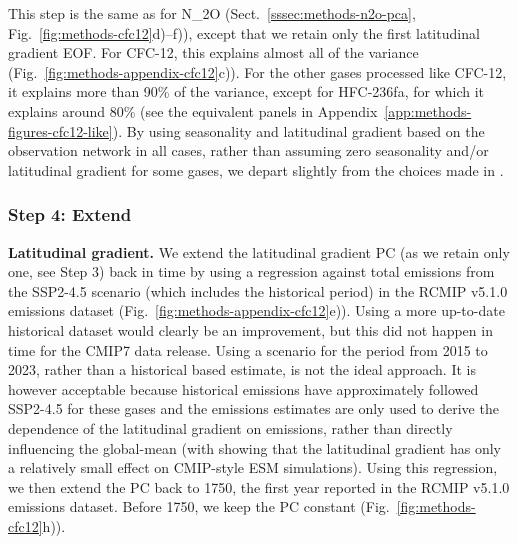 This step is the same as for N_2O (Sect.~\ref{sssec:methods-n2o-pca}, Fig.~\ref{fig:methods-cfc12}d)--f)),
except that we retain only the first latitudinal gradient EOF.
For CFC-12, this explains almost all of the variance (Fig.~\ref{fig:methods-appendix-cfc12}c)).
For the other gases processed like CFC-12, it explains more than 90\% of the variance,
except for HFC-236fa, for which it explains around 80\%
(see the equivalent panels in Appendix~\ref{app:methods-figures-cfc12-like}).
By using seasonality and latitudinal gradient based on the observation network in all cases,
rather than assuming zero seasonality and/or latitudinal gradient for some gases,
we depart slightly from the choices made in \citet{meinshausen_historical-ghgs_2017}.

\subsubsection{Step 4: Extend}
\label{sssec:methods-cfc12-like-extend}

\textbf{Latitudinal gradient.}
We extend the latitudinal gradient PC (as we retain only one, see Step 3)
back in time by using a regression against total emissions
from the SSP2-4.5 scenario (which includes the historical period) in the RCMIP v5.1.0 emissions dataset \citep{nicholls_rcmip_2020} (Fig.~\ref{fig:methods-appendix-cfc12}e)).
Using a more up-to-date historical dataset would clearly be an improvement,
but this did not happen in time for the CMIP7 data release.
Using a scenario for the period from 2015 to 2023, rather than a historical based estimate, is not the ideal approach.
It is however acceptable because historical emissions have approximately followed SSP2-4.5 for these gases
and the emissions estimates are only used to derive the dependence of the latitudinal gradient on emissions,
rather than directly influencing the global-mean
(with \citealp{meinshausen_historical-ghgs_2017} showing that the latitudinal gradient
has only a relatively small effect on CMIP-style ESM simulations).
Using this regression, we then extend the PC back to 1750,
the first year reported in the RCMIP v5.1.0 emissions dataset.
Before 1750, we keep the PC constant (Fig.~\ref{fig:methods-cfc12}h)).

